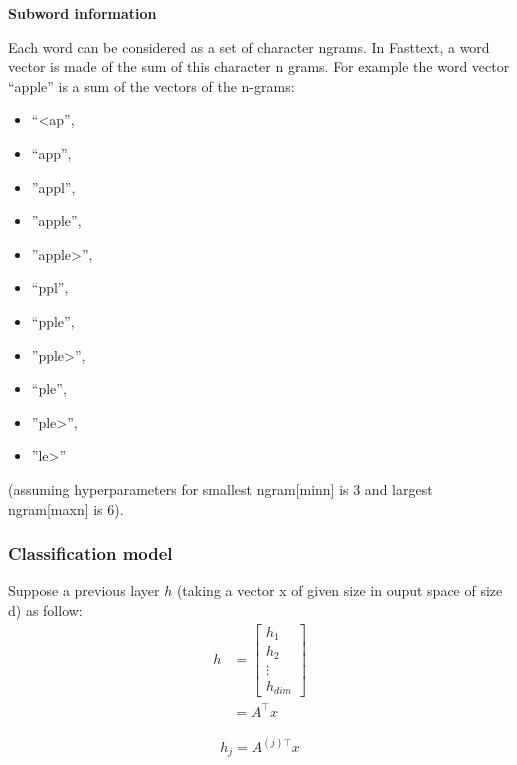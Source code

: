 \textbf{Subword information}

Each word can be considered as a set of character ngrams. In Fasttext, a word vector is made of the sum of this character n grams. For example the word vector “apple” is a sum of the vectors of the n-grams:
\begin{multicols}{3}
\begin{itemize}
	\item “<ap”, 
	\item “app”, 
	\item ”appl”, 
	\item ”apple”, 
	\item ”apple>”, 
	\item “ppl”, 
	\item “pple”, 
	\item ”pple>”, 
	\item “ple”, 
	\item ”ple>”, 
	\item ”le>”
\end{itemize}
\end{multicols}
 (assuming hyperparameters for smallest ngram[minn] is 3 and largest ngram[maxn] is 6).


\cite[Enriching Word Vectors with Subword Information]{fasttextEnriching}
\cite[Bag of Tricks for Efficient Text Classification]{fasttextTricks}

\subsubsection{Classification model}
Suppose a previous layer $h$ (taking a vector x of given size in ouput space of size d) as follow:
\begin{align}
	h 
	&= 
	\begin{bmatrix} 
		h_1 \\
		h_2 \\
		\vdots \\
		h_{\textit{dim}}
	\end{bmatrix}\\
	&= A^{\top}x
\end{align}


\begin{align}
	h_j = A^{(j)\top}x
\end{align}

